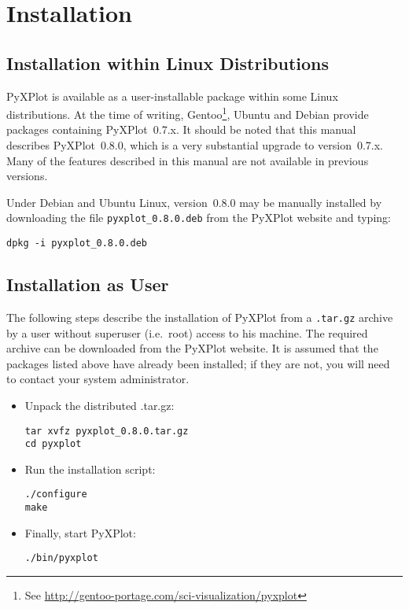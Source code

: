 \section{Installation}

\subsection{Installation within Linux Distributions}

PyXPlot is available as a user-installable package within some Linux
distributions. At the time of writing, Gentoo\footnote{See
\url{http://gentoo-portage.com/sci-visualization/pyxplot}}, Ubuntu and Debian provide packages containing
PyXPlot~0.7.x. It should be noted that this manual describes PyXPlot~0.8.0,
which is a very substantial upgrade to version~0.7.x. Many of the features
described in this manual are not available in previous versions.

Under Debian and Ubuntu Linux, version~0.8.0 may be manually installed by
downloading the file {\tt pyxplot\_0.8.0.deb} from the PyXPlot website and
typing:

\begin{verbatim}
dpkg -i pyxplot_0.8.0.deb
\end{verbatim}

\subsection{Installation as User}

The following steps describe the installation of PyXPlot from a {\tt .tar.gz}
archive by a user without superuser (i.e.\ root) access to his machine. The
required archive can be downloaded from the PyXPlot website. It is assumed that
the packages listed above have already been installed; if they are not, you
will need to contact your system administrator.

\begin{itemize}
\item Unpack the distributed .tar.gz:

\begin{verbatim}
tar xvfz pyxplot_0.8.0.tar.gz
cd pyxplot
\end{verbatim}

\item Run the installation script:

\begin{verbatim}
./configure
make
\end{verbatim}

\item Finally, start PyXPlot:

\begin{verbatim}
./bin/pyxplot
\end{verbatim}

\end{itemize}

